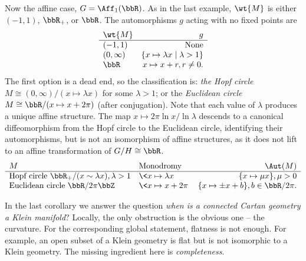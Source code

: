 \begin{example}
    Now the affine case, $G=\Aff_1(\bbR)$. As in the last example, $\wt{M}$ is either $(-1,1)$, $\bbR_+$, or $\bbR$. The automorphisms $g$ acting with no fixed points are 
    \[\begin{array}{lr}
        \wt{M} & g  \\\hline
        (-1,1) & \text{None}\\
        (0,\infty) & \{x\mapsto \lambda x\mid \lambda>1\}\\
        \bbR & x\mapsto x+r,r\neq 0.
    \end{array}\]
    The first option is a dead end, so the classification is: \emph{the Hopf circle} $M\cong (0,\infty)\slash (x\mapsto \lambda x)$ for some $\lambda>1$; or the \emph{Euclidean circle} $M\cong \bbR\slash (x\mapsto x+2\pi)$ (after conjugation). Note that each value of $\lambda$ produces a unique affine structure. The map $x\mapsto 2\pi \ln x\slash \ln\lambda$ descends to a canonical diffeomorphism from the Hopf circle to the Euclidean circle, identifying their automorphisms, but is not an isomorphism of affine structures, as it does not lift to an affine transformation of $G\slash H \cong\bbR$.
    \[\begin{array}{llr}
        M & \text{Monodromy} & \Aut(M)\\\hline
        \text{Hopf circle } \bbR_+\slash (x\sim \lambda x),\lambda>1 & \<x\mapsto \lambda x\> & \{x\mapsto \mu x\},\mu>0 \\
        \text{Euclidean circle } \bbR\slash 2\pi \bbZ & \<x\mapsto x+2\pi\> & \{x\mapsto \pm x+b\}, b\in \bbR\slash 2\pi.
    \end{array}\]
\end{example}

In the last corollary we answer the question \emph{when is a connected Cartan geometry a Klein manifold}? Locally, the only obstruction is the obvious one -- the curvature. For the corresponding global statement, flatness is not enough. For example, an open subset of a Klein geometry is flat but is not isomorphic to a Klein geometry. The missing ingredient here is \emph{completeness}.

